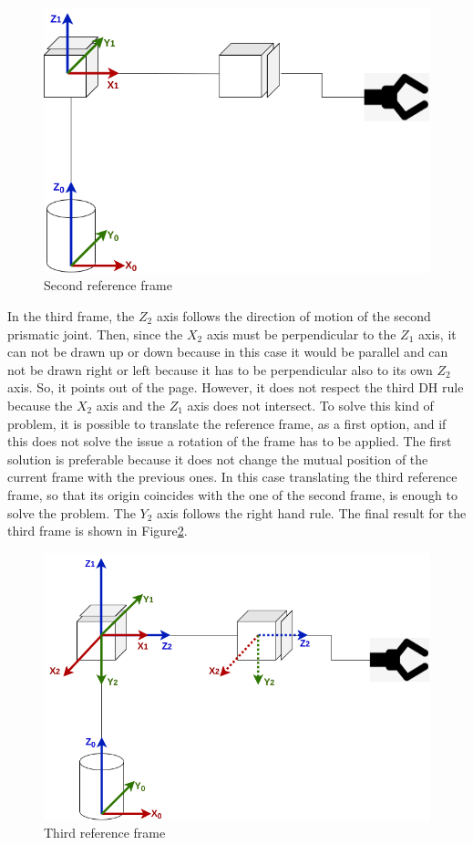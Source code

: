 \begin{figure}[!h]
\begin{center}
\includegraphics[width=0.6\linewidth]{capitolo3/figure/second_frame.png}
\caption{Second reference frame}
\label{fig:second_frame}
\end{center}
\end{figure}

In the third frame, the $Z_2$ axis follows the direction of motion of the second prismatic joint. Then, since the $X_2$ axis must be perpendicular to the $Z_1$ axis, it can not be drawn up or down because in this case it would be parallel and can not be drawn right or left because it has to be perpendicular also to its own $Z_2$ axis. So, it points out of the page. However, it does not respect the third DH rule because the $X_2$ axis and the $Z_1$ axis does not intersect. To solve this kind of problem, it is possible to translate the reference frame, as a first option, and if this does not solve the issue a rotation of the frame has to be applied. The first solution is preferable because it does not change the mutual position of the current frame with the previous ones. In this case translating the third reference frame, so that its origin coincides with the one of the second frame, is enough to solve the problem. The $Y_2$ axis follows the right hand rule. The final result for the third frame is shown in Figure\ref{fig:third_frame}.

\begin{figure}[!h]
\begin{center}
\includegraphics[width=0.6\linewidth]{capitolo3/figure/third_frame.png}
\caption{Third reference frame}
\label{fig:third_frame}
\end{center}
\end{figure}

